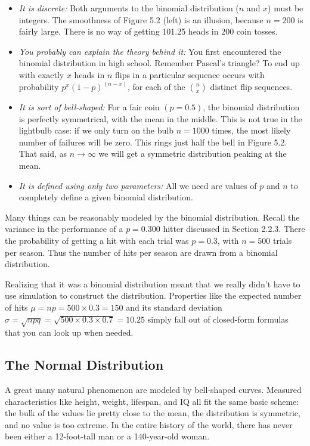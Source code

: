 \documentclass[10pt]{article}
\begin{document}
\begin{itemize}
  \item \textit{It is discrete:} Both arguments to the binomial distribution ($n$ and $x$) must be integers. The smoothness of Figure 5.2 (left) is an illusion, because $n=200$ is fairly large. There is no way of getting 101.25 heads in 200 coin tosses.
  \item \textit{You probably can explain the theory behind it:} You first encountered the binomial distribution in high school. Remember Pascal's triangle? To end up with exactly $x$ heads in $n$ flips in a particular sequence occurs with probability $p^{x}(1-p)^{(n-x)}$, for each of the $\binom{n}{x}$ distinct flip sequences.
  \item \textit{It is sort of bell-shaped:} For a fair coin $(p=0.5)$, the binomial distribution is perfectly symmetrical, with the mean in the middle. This is not true in the lightbulb case: if we only turn on the bulb $n=1000$ times, the most likely number of failures will be zero. This rings just half the bell in Figure 5.2. That said, as $n \rightarrow \infty$ we will get a symmetric distribution peaking at the mean.
  \item \textit{It is defined using only two parameters:} All we need are values of $p$ and $n$ to completely define a given binomial distribution.
\end{itemize}

Many things can be reasonably modeled by the binomial distribution. Recall the variance in the performance of a $p=0.300$ hitter discussed in Section 2.2.3. There the probability of getting a hit with each trial was $p=0.3$, with $n=500$ trials per season. Thus the number of hits per season are drawn from a binomial distribution.

Realizing that it was a binomial distribution meant that we really didn't have to use simulation to construct the distribution. Properties like the expected number of hits $\mu=n p=500 \times 0.3=150$ and its standard deviation $\sigma=\sqrt{n p q}=\sqrt{500 \times 0.3 \times 0.7}=10.25$ simply fall out of closed-form formulas that you can look up when needed.

\subsection{The Normal Distribution}
A great many natural phenomenon are modeled by bell-shaped curves. Measured characteristics like height, weight, lifespan, and IQ all fit the same basic scheme: the bulk of the values lie pretty close to the mean, the distribution is symmetric, and no value is too extreme. In the entire history of the world, there has never been either a 12-foot-tall man or a 140-year-old woman.
\end{document}
